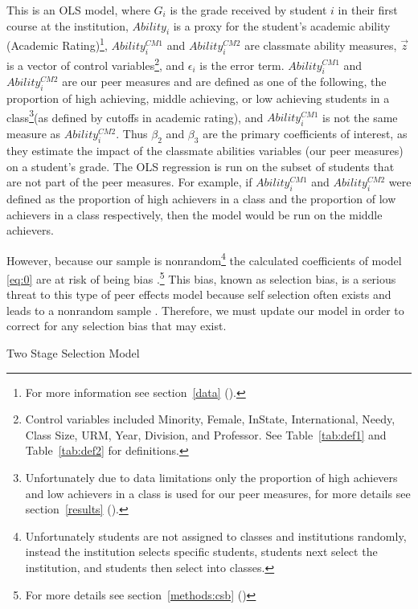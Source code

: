 \documentclass[12pt,a4paper,english,fleqn]{article}
\makeatletter
\newcommand{\sectlabel}[1]{section~\ref{#1} (\nameref{#1})}
\newcommand{\tablelabel}[1]{Table~\ref{#1}}
\renewcommand\subsection{\@startsection{subsection}{2}
{\z@}{-3.25ex\@plus -1ex \@minus -.2ex}{1.5ex \@plus .2ex}{\normalfont\bf}}
\makeatother
\begin{document}
This is an OLS model, where $G_{i}$ is the grade received by student $i$ in their first course at the institution, $Ability_{i}$ is a proxy for the student's academic ability (Academic Rating)\footnote{For more information see \sectlabel{data}.}, $Ability_{i}^{CM1}$ and $Ability_{i}^{CM2}$ are classmate ability measures, $\overrightarrow{z}$ is a vector of control variables\footnote{Control variables included Minority, Female, InState, International, Needy, Class Size, URM, Year, Division, and Professor. See \tablelabel{tab:def1} and \tablelabel{tab:def2} for definitions.}, and $\epsilon_{i}$ is the error term. 
$Ability_{i}^{CM1}$ and $Ability_{i}^{CM2}$ are our peer measures and are defined as one of the following, the proportion of high achieving, middle achieving, or low achieving students in a class\footnote{Unfortunately due to data limitations only the proportion of high achievers and low achievers in a class is used for our peer measures, for more details see \sectlabel{results}.}(as defined by cutoffs in academic rating), and $Ability_{i}^{CM1}$ is not the same measure as  $Ability_{i}^{CM2}$. 
Thus $\beta_{2}$ and $\beta_{3}$ are the primary coefficients of interest, as they estimate the impact of the classmate abilities variables (our peer measures) on a student's grade. 
The OLS regression is run on the subset of students that are not part of the peer measures. 
For example, if $Ability_{i}^{CM1}$ and $Ability_{i}^{CM2}$ were defined as the proportion of high achievers in a class and the proportion of low achievers in a class respectively, then the model would be run on the middle achievers. 

However, because our sample is nonrandom\footnote{Unfortunately students are not assigned to classes and institutions randomly, instead the institution selects specific students, students next select the institution, and students then select into classes.} the calculated coefficients of model \eqref{eq:0} are at risk of being bias \citep{heckman1979sample}.\footnote{For more details see \sectlabel{methods:csb}} This bias, known as selection bias, is a serious threat to this type of peer effects model because self selection often exists and leads to a nonrandom sample \citep{carman2012classroom,burke2013classroom,ding2007peers}. Therefore, we must update our model in order to correct for any selection bias that may exist.

\subsection{Two Stage Selection Model}\label{methods:tssmodel}
\end{document}

